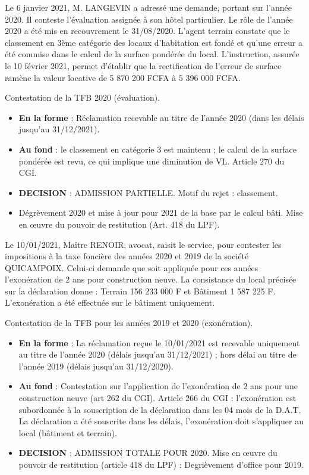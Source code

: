 \documentclass[answers, 12pt]{exam}
\begin{document}
\begin{questions}
		\question Le 6 janvier 2021, M. LANGEVIN a adressé une demande, portant sur l'année 2020. Il conteste l'évaluation assignée à son hôtel particulier. Le rôle de l'année 2020 a été mis en recouvrement le 31/08/2020. L'agent terrain constate que le classement en 3ème catégorie des locaux d'habitation est fondé et qu'une erreur a été commise dans le calcul de la surface pondérée du local. L'instruction, assurée le 10 février 2021, permet d'établir que la rectification de l'erreur de surface ramène la valeur locative de 5 870 200 FCFA à 5 396 000 FCFA.
		\begin{solution}
			Contestation de la TFB 2020 (évaluation).
			\begin{itemize}
				\item \textbf{En la forme} : Réclamation recevable au titre de l'année 2020 (dans les délais jusqu'au 31/12/2021).
				\item \textbf{Au fond} : le classement en catégorie 3 est maintenu ; le calcul de la surface pondérée est revu, ce qui implique une diminution de VL. Article 270 du CGI.
				\item \textbf{DECISION} : ADMISSION PARTIELLE. Motif du rejet : classement.
				\item Dégrèvement 2020 et mise à jour pour 2021 de la base par le calcul bâti. Mise en œuvre du pouvoir de restitution (Art. 418 du LPF).
			\end{itemize}
		\end{solution}
		
		\question Le 10/01/2021, Maître RENOIR, avocat, saisit le service, pour contester les impositions à la taxe foncière des années 2020 et 2019 de la société QUICAMPOIX. Celui-ci demande que soit appliquée pour ces années l'exonération de 2 ans pour construction neuve. La consistance du local précisée sur la déclaration donne : Terrain 156 233 000 F et Bâtiment 1 587 225 F. L'exonération a été effectuée sur le bâtiment uniquement.
		\begin{solution}
			Contestation de la TFB pour les années 2019 et 2020 (exonération).
			\begin{itemize}
				\item \textbf{En la forme} : La réclamation reçue le 10/01/2021 est recevable uniquement au titre de l'année 2020 (délais jusqu'au 31/12/2021) ; hors délai au titre de l'année 2019 (délais jusqu'au 31/12/2020).
				\item \textbf{Au fond} : Contestation sur l'application de l'exonération de 2 ans pour une construction neuve (art 262 du CGI). Article 266 du CGI : l'exonération est subordonnée à la souscription de la déclaration dans les 04 mois de la D.A.T. La déclaration a été souscrite dans les délais, l'exonération doit s'appliquer au local (bâtiment et terrain).
				\item \textbf{DECISION} : ADMISSION TOTALE POUR 2020. Mise en œuvre du pouvoir de restitution (article 418 du LPF) : Degrièvement d'office pour 2019.
			\end{itemize}
		\end{solution}
		

\end{questions}
\end{document}
